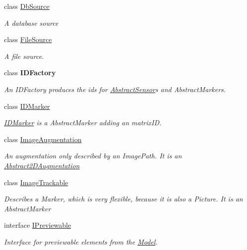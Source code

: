 \begin{DoxyCompactItemize}
class \hyperlink{class_a_rdev_kit_1_1_model_1_1_project_1_1_db_source}{Db\-Source}
\begin{DoxyCompactList}\small\item\em A database source \end{DoxyCompactList}\item 
class \hyperlink{class_a_rdev_kit_1_1_model_1_1_project_1_1_file_source}{File\-Source}
\begin{DoxyCompactList}\small\item\em A file source. \end{DoxyCompactList}\item 
class {\bfseries I\-D\-Factory}
\begin{DoxyCompactList}\small\item\em An I\-D\-Factory produces the ids for \hyperlink{class_a_rdev_kit_1_1_model_1_1_project_1_1_abstract_sensor}{Abstract\-Sensor}s and Abstract\-Markers. \end{DoxyCompactList}\item 
class \hyperlink{class_a_rdev_kit_1_1_model_1_1_project_1_1_i_d_marker}{I\-D\-Marker}
\begin{DoxyCompactList}\small\item\em \hyperlink{class_a_rdev_kit_1_1_model_1_1_project_1_1_i_d_marker}{I\-D\-Marker} is a Abstract\-Marker adding an matrix\-I\-D. \end{DoxyCompactList}\item 
class \hyperlink{class_a_rdev_kit_1_1_model_1_1_project_1_1_image_augmentation}{Image\-Augmentation}
\begin{DoxyCompactList}\small\item\em An augmentation only described by an Image\-Path. It is an \hyperlink{class_a_rdev_kit_1_1_model_1_1_project_1_1_abstract2_d_augmentation}{Abstract2\-D\-Augmentation} \end{DoxyCompactList}\item 
class \hyperlink{class_a_rdev_kit_1_1_model_1_1_project_1_1_image_trackable}{Image\-Trackable}
\begin{DoxyCompactList}\small\item\em Describes a Marker, which is very flexible, because it is also a Picture. It is an Abstract\-Marker \end{DoxyCompactList}\item 
interface \hyperlink{interface_a_rdev_kit_1_1_model_1_1_project_1_1_i_previewable}{I\-Previewable}
\begin{DoxyCompactList}\small\item\em Interface for previewable elements from the \hyperlink{namespace_a_rdev_kit_1_1_model}{Model}. \end{DoxyCompactList}\item 

\end{DoxyCompactItemize}
